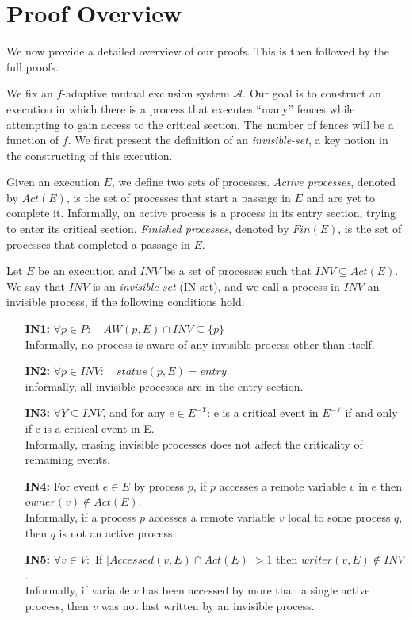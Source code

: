 \section{Proof Overview}
\label{sec:proofOverview}

We now provide a detailed overview of our proofs. This is then followed by the full proofs.

We fix an $f$-adaptive mutual exclusion system $\mathcal{A}$. Our goal is to construct an execution in which there is a process that executes ``many'' fences while attempting to gain access to the critical section. The number of fences will be a function of $f$. We first present the definition of an \emph{invisible-set}, a key notion in the constructing of this execution.

Given an execution $E$, we define two sets of processes. \emph{Active processes}, denoted by $Act(E)$, is the set of processes that start a passage in $E$ and are yet to complete it. Informally, an active process is a process in its entry section, trying to enter its critical section. \emph{Finished processes}, denoted by $Fin(E)$, is the set of processes that completed a passage in $E$.

\begin{definition}
\label{def:inv}
	Let $E$ be an execution and $\mathit{INV}$ be a set of processes such that $\mathit{INV} \subseteq Act(E)$. We say that $\mathit{INV}$ is an \emph{invisible set} (IN-set), and we call a process in $\mathit{INV}$ an invisible process, if the following conditions hold:
	\begin{enumerate}
		\item[\bf IN1:] $\forall p \in P: \quad AW(p,E) \cap \mathit{INV} \subseteq \{p\}$
		\\ Informally, no process is aware of any invisible process other than itself.
		\item[\bf IN2:] $\forall p \in \mathit{INV}: \quad status(p, E) = entry$.
		\\informally, all invisible processes are in the entry section.
		\item[\bf IN3:] $\forall Y \subseteq \mathit{INV}$, and for any $e \in E^{-Y}$: e is a critical event in $E^{-Y}$ if and only if e is a critical event in E.
		\\ Informally, erasing invisible processes does not affect the criticality of remaining events.
		\item[\bf IN4:] For event $e \in E$ by process $p$, if $p$ accesses a remote variable $v$ in $e$ then $owner(v) \notin Act(E)$.
		\\ Informally, if a process $p$ accesses a remote variable $v$ local to some process $q$, then $q$ is not an active process.
		\item[\bf IN5:] $\forall v \in V:$ If $|Accessed(v,E) \cap Act(E)| > 1$ then $writer(v,E) \notin \mathit{INV}$.
		\\ Informally, if variable $v$ has been accessed by more than a single active process, then $v$ was not last written by an invisible process.
	\end{enumerate}
\end{definition}
	
